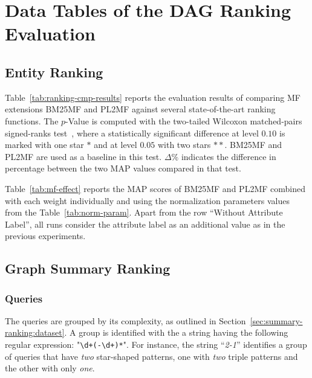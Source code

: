 \chapter{Data Tables of the DAG Ranking Evaluation}

\section{Entity Ranking}

Table~\ref{tab:ranking-cmp-results} reports the evaluation results of comparing MF extensions BM25MF and PL2MF against several state-of-the-art ranking functions. The $p$-Value is computed with the two-tailed Wilcoxon matched-pairs signed-ranks test~\cite{sheskin:2003:CRC,buttcher:2010:IRI:1869919}, where a statistically significant difference at level $0.10$ is marked with one star $*$ and at level $0.05$ with two stars $**$. BM25MF and PL2MF are used as a baseline in this test. $\Delta\%$ indicates the difference in percentage between the two MAP values compared in that test.




Table~\ref{tab:mf-effect} reports the MAP scores of BM25MF and PL2MF combined with each weight individually and using the normalization parameters values from the Table~\ref{tab:norm-param}. Apart from the row ``Without Attribute Label'', all runs consider the attribute label as an additional value as in the previous experiments.



\section{Graph Summary Ranking}
\label{app:summary-ranking}

\subsection{Queries}

The queries are grouped by its complexity, as outlined in Section~\ref{sec:summary-ranking:dataset}. A group is identified with the a string having the following regular expression: "\verb/\d+(-\d+)*/". For instance, the string ``\emph{2-1}'' identifies a group of queries that have \textit{two} star-shaped patterns, one with \textit{two} triple patterns and the other with only \textit{one}.

